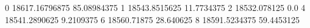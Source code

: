 0 18617.16796875 85.08984375
1 18543.8515625 11.7734375
2 18532.078125 0.0
4 18541.2890625 9.2109375
6 18560.71875 28.640625
8 18591.5234375 59.4453125
